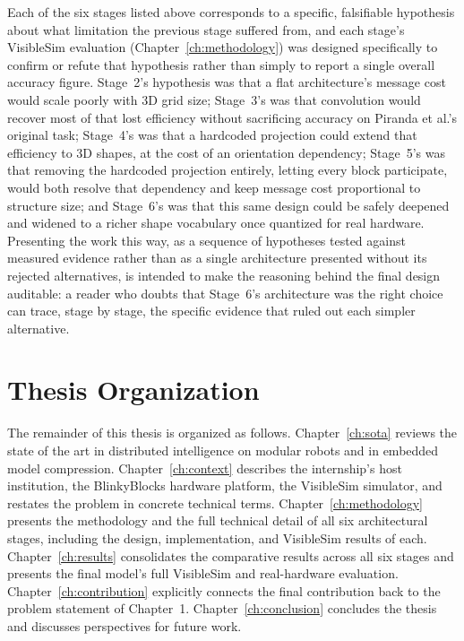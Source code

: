 \documentclass[12pt,a4paper]{report}
\begin{document}
Each of the six stages listed above corresponds to a specific, falsifiable hypothesis about what limitation the previous stage suffered from, and each stage's VisibleSim evaluation (Chapter~\ref{ch:methodology}) was designed specifically to confirm or refute that hypothesis rather than simply to report a single overall accuracy figure. Stage~2's hypothesis was that a flat architecture's message cost would scale poorly with 3D grid size; Stage~3's was that convolution would recover most of that lost efficiency without sacrificing accuracy on Piranda et al.'s original task; Stage~4's was that a hardcoded projection could extend that efficiency to 3D shapes, at the cost of an orientation dependency; Stage~5's was that removing the hardcoded projection entirely, letting every block participate, would both resolve that dependency and keep message cost proportional to structure size; and Stage~6's was that this same design could be safely deepened and widened to a richer shape vocabulary once quantized for real hardware. Presenting the work this way, as a sequence of hypotheses tested against measured evidence rather than as a single architecture presented without its rejected alternatives, is intended to make the reasoning behind the final design auditable: a reader who doubts that Stage~6's architecture was the right choice can trace, stage by stage, the specific evidence that ruled out each simpler alternative.

\section{Thesis Organization}

The remainder of this thesis is organized as follows. Chapter~\ref{ch:sota} reviews the state of the art in distributed intelligence on modular robots and in embedded model compression. Chapter~\ref{ch:context} describes the internship's host institution, the BlinkyBlocks hardware platform, the VisibleSim simulator, and restates the problem in concrete technical terms. Chapter~\ref{ch:methodology} presents the methodology and the full technical detail of all six architectural stages, including the design, implementation, and VisibleSim results of each. Chapter~\ref{ch:results} consolidates the comparative results across all six stages and presents the final model's full VisibleSim and real-hardware evaluation. Chapter~\ref{ch:contribution} explicitly connects the final contribution back to the problem statement of Chapter~1. Chapter~\ref{ch:conclusion} concludes the thesis and discusses perspectives for future work.
\end{document}
